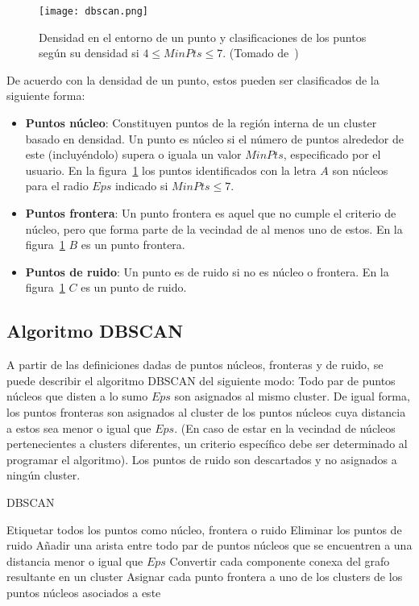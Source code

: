 \begin{figure}[!h]
    \centering
    \texttt{[image: dbscan.png]}
    \caption{Densidad en el entorno de un punto y clasificaciones de los puntos según su densidad si $4 \leq MinPts \leq 7$. (Tomado de~\cite{Tan05})}
    \label{img:dbscan}
\end{figure}

De acuerdo con la densidad de un punto, estos pueden ser clasificados de la siguiente forma:

\begin{itemize}
    \item \textbf{Puntos núcleo}: Constituyen puntos de la región interna de un cluster basado en densidad.
    Un punto es núcleo si el número de puntos alrededor de este (incluyéndolo) supera o iguala un valor $MinPts$, especificado por el usuario.
    En la figura~\ref{img:dbscan} los puntos identificados con la letra $A$ son núcleos para el radio $Eps$ indicado si $MinPts\leq 7$.
    \item \textbf{Puntos frontera}: Un punto frontera es aquel que no cumple el criterio de núcleo, pero que forma parte de la vecindad de al menos uno de estos.
    En la figura~\ref{img:dbscan} $B$ es un punto frontera.
    \item \textbf{Puntos de ruido}: Un punto es de ruido si no es núcleo o frontera.
    En la figura~\ref{img:dbscan} $C$ es un punto de ruido.
\end{itemize}

\subsection{Algoritmo DBSCAN}\label{subsec:DBSCAN}

A partir de las definiciones dadas de puntos núcleos, fronteras y de ruido, se puede describir el algoritmo DBSCAN del siguiente modo: Todo par de puntos núcleos que disten a lo sumo $Eps$ son asignados al mismo cluster.
De igual forma, los puntos fronteras son asignados al cluster de los puntos núcleos cuya distancia a estos sea menor o igual que $Eps$.
(En caso de estar en la vecindad de núcleos pertenecientes a clusters diferentes, un criterio específico debe ser determinado al programar el algoritmo).
Los puntos de ruido son descartados y no asignados a ningún cluster.

\begin{algorithm}
    \caption{DBSCAN}
    \label{algorithm:DBSCAN}
    Etiquetar todos los puntos como núcleo, frontera o ruido\;
    Eliminar los puntos de ruido\;
    Añadir una arista entre todo par de puntos núcleos que se encuentren a una distancia menor o igual que $Eps$\;
    Convertir cada componente conexa del grafo resultante en un cluster\;
    Asignar cada punto frontera a uno de los clusters de los puntos núcleos asociados a este\;
\end{algorithm}

